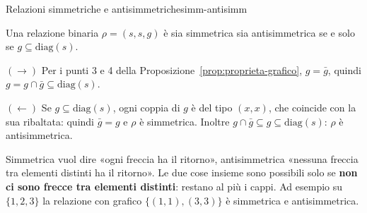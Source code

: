 \begin{concetto}
\begin{Corollario}{Relazioni simmetriche e antisimmetriche}{simm-antisimm}
    \begin{prerequisiti}
    \end{prerequisiti}
    Una relazione binaria $\rho = (s, s, g)$ è sia simmetrica sia antisimmetrica se e solo se $g \subseteq \mathrm{diag}(s)$.
\end{Corollario}
\begin{dimostrazione}
    \begin{caso}{$(\rightarrow)$}
        Per i punti 3 e 4 della Proposizione~\ref{prop:proprieta-grafico}, $g = \bar{g}$, quindi $g = g \cap \bar{g} \subseteq \mathrm{diag}(s)$.
    \end{caso}
    \begin{caso}{$(\leftarrow)$}
        Se $g \subseteq \mathrm{diag}(s)$, ogni coppia di $g$ è del tipo $(x, x)$, che coincide con la sua ribaltata: quindi
        $\bar{g} = g$ e $\rho$ è simmetrica. Inoltre $g \cap \bar{g} \subseteq g \subseteq \mathrm{diag}(s)$: $\rho$ è antisimmetrica.
    \end{caso}
\end{dimostrazione}
\end{concetto}

\begin{spiegazione}
    Simmetrica vuol dire «ogni freccia ha il ritorno», antisimmetrica «nessuna freccia tra elementi distinti ha il ritorno».
    Le due cose insieme sono possibili solo se \textbf{non ci sono frecce tra elementi distinti}: restano al più i cappi.
    Ad esempio su $\{1, 2, 3\}$ la relazione con grafico $\{(1,1), (3,3)\}$ è simmetrica e antisimmetrica.
\end{spiegazione}

